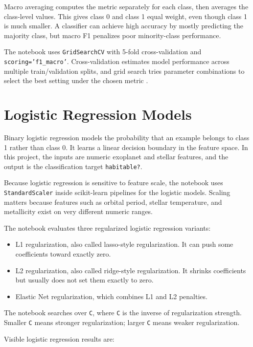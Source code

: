 \documentclass[11pt]{article}
\begin{document}
Macro averaging computes the metric separately for each class, then averages the class-level values. This gives class 0 and class 1 equal weight, even though class 1 is much smaller. A classifier can achieve high accuracy by mostly predicting the majority class, but macro F1 penalizes poor minority-class performance.

The notebook uses \texttt{GridSearchCV} with 5-fold cross-validation and \texttt{scoring='f1\_macro'}. Cross-validation estimates model performance across multiple train/validation splits, and grid search tries parameter combinations to select the best setting under the chosen metric \cite{sklearnCrossValidation,sklearnGridSearchCV}.

\section{Logistic Regression Models}

Binary logistic regression models the probability that an example belongs to class 1 rather than class 0. It learns a linear decision boundary in the feature space. In this project, the inputs are numeric exoplanet and stellar features, and the output is the classification target \texttt{habitable?}.

Because logistic regression is sensitive to feature scale, the notebook uses \texttt{StandardScaler} inside scikit-learn pipelines for the logistic models. Scaling matters because features such as orbital period, stellar temperature, and metallicity exist on very different numeric ranges.

The notebook evaluates three regularized logistic regression variants:

\begin{itemize}
  \item L1 regularization, also called lasso-style regularization. It can push some coefficients toward exactly zero.
  \item L2 regularization, also called ridge-style regularization. It shrinks coefficients but usually does not set them exactly to zero.
  \item Elastic Net regularization, which combines L1 and L2 penalties.
\end{itemize}

The notebook searches over \texttt{C}, where \texttt{C} is the inverse of regularization strength. Smaller \texttt{C} means stronger regularization; larger \texttt{C} means weaker regularization.

Visible logistic regression results are:
\end{document}
